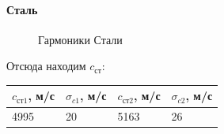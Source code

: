 \documentclass[a4paper, 12pt]{article}%
\begin{document}
\paragraph*{Сталь}
\begin{figure}[h!]
\caption{Гармоники Стали}
\end{figure}
Отсюда находим $c_{\text{ст}}$:
\begin{table}[h]
\begin{tabular}{|l|l|l|l|}
\hline
$c_{\text{ст1}}$, м/с & $\sigma_{c1}$, м/с & $c_{\text{ст2}}$, м/с & $\sigma_{c2}$, м/с \\ \hline
4995                  & 20                  & 5163                  & 26 \\ \hline
\end{tabular}
\end{table}
\\
\end{document}
